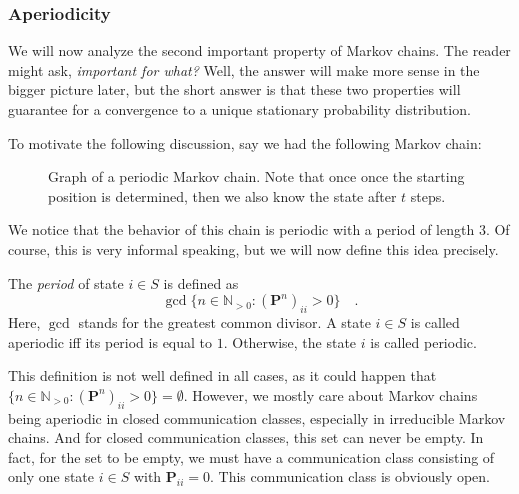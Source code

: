 \documentclass[../../main.tex]{subfiles}
\begin{document}
\subsubsection{Aperiodicity}
We will now analyze the second important property of Markov chains. The reader might ask, \emph{important for what?} Well, the answer will make more sense in the bigger picture later, but the short answer is that these two properties will guarantee for a convergence to a unique stationary probability distribution.

To motivate the following discussion, say we had the following Markov chain:

\begin{figure}[h]
    \center
    \caption{Graph of a periodic Markov chain. Note that once once the starting position is determined, then we also know the state after $t$ steps.}
    \label{fig:markov_chain_periodic}
\end{figure}

We notice that the behavior of this chain is periodic with a period of length $3$. Of course, this is very informal speaking, but we will now define this idea precisely.

\begin{definition}
    The \emph{period} of state $i \in S$ is defined as
    \[ \gcd \{ n \in \mathbb{N}_{>0} : (\bm{P}^n)_{ii} > 0 \} \quad . \]
    Here, $\gcd$ stands for the greatest common divisor. A state $i \in S$ is called aperiodic iff its period is equal to $1$. Otherwise, the state $i$ is called periodic.
\end{definition}

\begin{remark}
    This definition is not well defined in all cases, as it could happen that $\{ n \in \mathbb{N}_{>0} : (\bm{P}^n)_{ii} > 0 \} = \emptyset$. However, we mostly care about Markov chains being aperiodic in closed communication classes, especially in irreducible Markov chains. And for closed communication classes, this set can never be empty. In fact, for the set to be empty, we must have a communication class consisting of only one state $i \in S$ with $\bm{P}_{ii} = 0$. This communication class is obviously open.
\end{remark}
\end{document}
